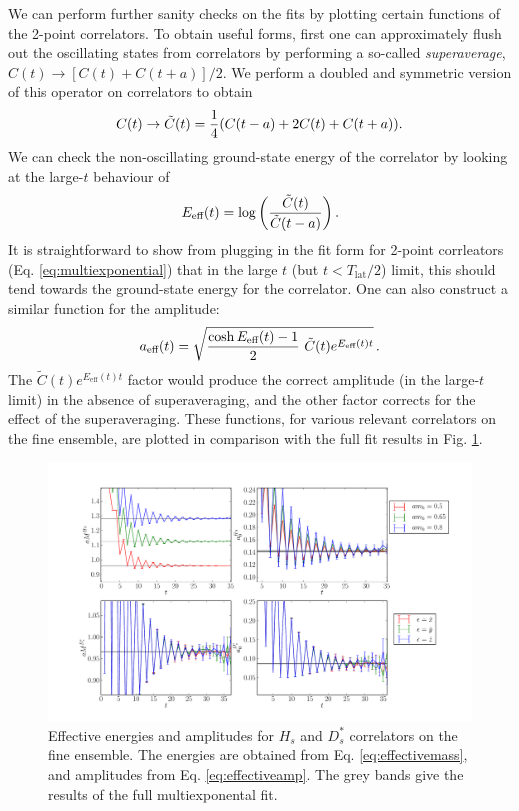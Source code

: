 We can perform further sanity checks on the fits by plotting certain functions of the 2-point correlators. To obtain useful forms, first one can approximately flush out the oscillating states from correlators by performing a so-called {\it{superaverage}}, $C(t) \to [ C(t) + C(t+a) ]/2$. We perform a doubled and symmetric version of this operator on correlators to obtain
\begin{align}
  C(t) \to \tilde{C}(t) = {1\over 4}( C(t-a) + 2C(t) + C(t+a) ).
  \label{eq:superav2}
\end{align}
We can check the non-oscillating ground-state energy of the correlator by looking at the large-$t$ behaviour of
\begin{align}
  E_{\text{eff}}(t) = \log\left({ \tilde{C}(t)\over \tilde{C}(t-a) }\right).
  \label{eq:effectivemass}
\end{align}
It is straightforward to show from plugging in the fit form for 2-point corrleators (Eq. \eqref{eq:multiexponential}) that in the large $t$ (but $t < T_{\text{lat}}/2$) limit, this should tend towards the ground-state energy for the correlator. One can also construct a similar function for the amplitude:
\begin{align}
  a_{\text{eff}}(t) = \sqrt{{\cosh E_{\text{eff}}(t)-1\over 2} \,\,\tilde{C}(t) e^{E_{\text{eff}}(t)t} }\,.
  \label{eq:effectiveamp}
\end{align}
The $\tilde{C}(t)e^{E_{\text{eff}}(t)t}$ factor would produce the correct amplitude (in the large-$t$ limit) in the absence of superaveraging, and the other factor corrects for the effect of the superaveraging. These functions, for various relevant correlators on the fine ensemble, are plotted in comparison with the full fit results in Fig. \ref{fig:2pt-summary_BsDsstar}.

\begin{figure}[htb!]
    \hspace{-50pt}
    \includegraphics[width=1.3\textwidth]{images/BsDsstar/2ptsummary_fine.pdf}
  \caption{Effective energies and amplitudes for $H_s$ and $D_s^*$ correlators on the fine ensemble. The energies are obtained from Eq. \eqref{eq:effectivemass}, and amplitudes from Eq. \eqref{eq:effectiveamp}. The grey bands give the results of the full multiexponental fit. \label{fig:2pt-summary_BsDsstar}}
\end{figure}

